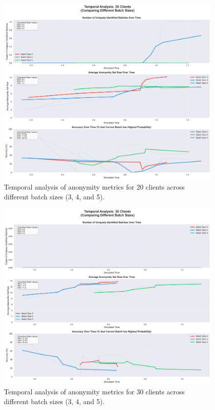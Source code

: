 \documentclass{article}
\begin{document}
\begin{figure}[!htb]
\centering
\includegraphics[width=\textwidth]{diagrams/temporal_5_smoothed_20_clients.png}
\caption{Temporal analysis of anonymity metrics for 20 clients across different batch sizes (3, 4, and 5).}
\label{fig:temporal_analysis_20}
\end{figure}

\begin{figure}[!htb]
\centering
\includegraphics[width=\textwidth]{diagrams/temporal_5_smoothed_30_clients.png}
\caption{Temporal analysis of anonymity metrics for 30 clients across different batch sizes (3, 4, and 5).}
\label{fig:temporal_analysis_30}
\end{figure}
\end{document}
